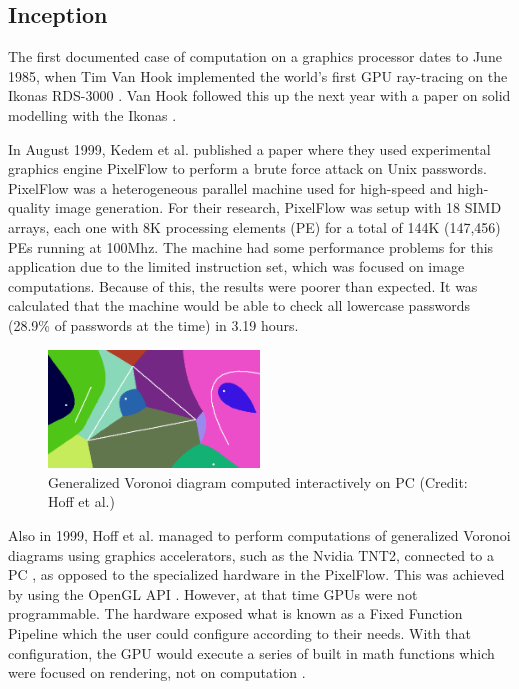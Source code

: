 \subsection{Inception}
The first documented case of computation on a graphics processor dates to June 1985, when Tim Van Hook implemented the world's first GPU ray-tracing on the Ikonas RDS-3000 \cite{ikonas}. Van Hook followed this up the next year with a paper on solid modelling with the Ikonas \cite{solid_modeling_ikonas}.

In August 1999, Kedem et al. \cite{unix_passwords_gpgpu} published a paper where they used experimental graphics engine PixelFlow to perform a brute force attack on Unix passwords. PixelFlow was a heterogeneous parallel machine used for high-speed and high-quality image generation. For their research, PixelFlow was setup with 18 SIMD arrays, each one with 8K processing elements (PE) for a total of 144K (147,456) PEs running at 100Mhz. The machine had some performance problems for this application due to the limited instruction set, which was focused on image computations. Because of this, the results were poorer than expected. It was calculated that the machine would be able to check all lowercase passwords (28.9\% of passwords at the time) in 3.19 hours.

\begin{figure}[h]
    \centering
    \includegraphics[width=0.5\textwidth]{img/voronoi.png}
    \captionsetup{justification=centering}
    \caption{Generalized Voronoi diagram computed interactively on PC (Credit: Hoff et al.)}
\end{figure}

Also in 1999, Hoff et al. \cite{voronoi_diagrams_gpgpu} managed to perform computations of generalized Voronoi diagrams using graphics accelerators, such as the Nvidia TNT2, connected to a PC \cite{brief_history_gpgpu}, as opposed to the specialized hardware in the PixelFlow. This was achieved by using the OpenGL API \cite{opengl}. However, at that time GPUs were not programmable. The hardware exposed what is known as a Fixed Function Pipeline which the user could configure according to their needs. With that configuration, the GPU would execute a series of built in math functions which were focused on rendering, not on computation \cite{opengl_fixed_function_pipeline}.

